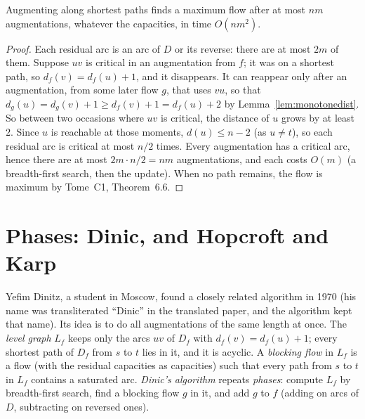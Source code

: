 \begin{theorem}\label{thm:edmondskarp}
Augmenting along shortest paths finds a maximum flow after at most $nm$ augmentations, whatever the capacities, in time $O(nm^2)$.
\end{theorem}
\begin{proof}
Each residual arc is an arc of $D$ or its reverse: there are at most $2m$ of them. Suppose $uv$ is critical in an augmentation from $f$; it was on a shortest path, so $d_f(v)=d_f(u)+1$, and it disappears.
It can reappear only after an augmentation, from some later flow $g$, that uses $vu$, so that $d_g(u)=d_g(v)+1\ge d_f(v)+1=d_f(u)+2$ by Lemma~\ref{lem:monotonedist}. So between two occasions where $uv$ is critical, the distance of $u$ grows by at least $2$.
Since $u$ is reachable at those moments, $d(u)\le n-2$ (as $u\ne t$), so each residual arc is critical at most $n/2$ times. Every augmentation has a critical arc, hence there are at most $2m\cdot n/2=nm$ augmentations, and each costs $O(m)$
(a breadth-first search, then the update). When no path remains, the flow is maximum by Tome~C1, Theorem~6.6.
\end{proof}

\section{Phases: Dinic, and Hopcroft and Karp}\label{sec:dinic}

Yefim Dinitz, a student in Moscow, found a closely related algorithm in 1970 (his name was transliterated ``Dinic'' in the translated paper, and the algorithm kept that name). Its idea is to do all augmentations
of the same length at once. The \emph{level graph} $L_f$ keeps only the arcs $uv$ of $D_f$ with $d_f(v)=d_f(u)+1$; every shortest path of $D_f$ from $s$ to $t$ lies in it, and it is acyclic. A \emph{blocking flow} in $L_f$ is a flow
(with the residual capacities as capacities) such that every path from $s$ to $t$ in $L_f$ contains a saturated arc. \emph{Dinic's algorithm} repeats \emph{phases}: compute $L_f$ by breadth-first search, find a blocking flow $g$ in it,
and add $g$ to $f$ (adding on arcs of $D$, subtracting on reversed ones).

